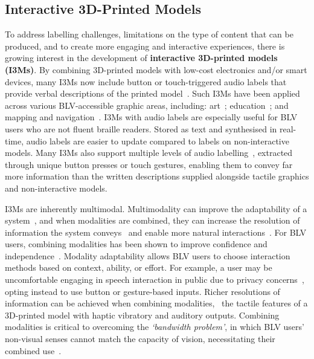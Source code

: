 \subsection{Interactive 3D-Printed Models}
To address labelling challenges, limitations on the type of content that can be produced, and to create more engaging and interactive experiences, there is growing interest in the development of \textbf{interactive 3D-printed models (I3Ms)}. By combining 3D-printed models with low-cost electronics and/or smart devices, many I3Ms now include button or touch-triggered audio labels that provide verbal descriptions of the printed model~\cite{Landau2009,Shi2016,Reichinger2016,Giraud2017,Gotzelmann2017,Holloway2018,Ghodke2019,Davis2020}. Such I3Ms have been applied across various BLV-accessible graphic areas, including: art~\cite{Holloway2019,Bartolome2019,Butler2023}; education~\cite{Ghodke2019,Shi2019,Reinders2020}; and mapping and navigation~\cite{Gotzelmann2017,Holloway2018,Shi2020}. I3Ms with audio labels are especially useful for BLV users who are not fluent braille readers. Stored as text and synthesised in real-time, audio labels are easier to update compared to labels on non-interactive models. Many I3Ms also support multiple levels of audio labelling~\cite{Holloway2018,Shi2019,Reinders2020}, extracted through unique button presses or touch gestures, enabling them to convey far more information than the written descriptions supplied alongside tactile graphics and non-interactive models.

I3Ms are inherently multimodal. Multimodality can improve the adaptability of a system~\cite{Reeves2004}, and when modalities are combined, they can increase the resolution of information the system conveys~\cite{Edwards2015} and enable more natural interactions~\cite{Bolt1980}. For BLV users, combining modalities has been shown to improve confidence and independence~\cite{Quero2021}. Modality adaptability allows BLV users to choose interaction methods based on context, ability, or effort. For example, a user may be uncomfortable engaging in speech interaction in public due to privacy concerns~\cite{Abdolrahmani2018}, opting instead to use button or gesture-based inputs. Richer resolutions of information can be achieved when combining modalities, \eg\, the tactile features of a 3D-printed model with haptic vibratory and auditory outputs. Combining modalities is critical to overcoming the \textit{`bandwidth problem'}, in which BLV users' non-visual senses cannot match the capacity of vision, necessitating their combined use~\cite{Edwards2015}.


